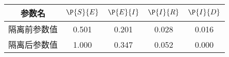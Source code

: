 \begin{tabular}{ccccc}
\hline
参数名&$\P{S}{E}$&$\P{E}{I}$&$\P{I}{R}$&$\P{I}{D}$\\
\hline
隔离前参数值&0.501&0.201&0.028&0.016\\
隔离后参数值&1.000&0.347&0.052&0.000\\
\hline
\end{tabular}